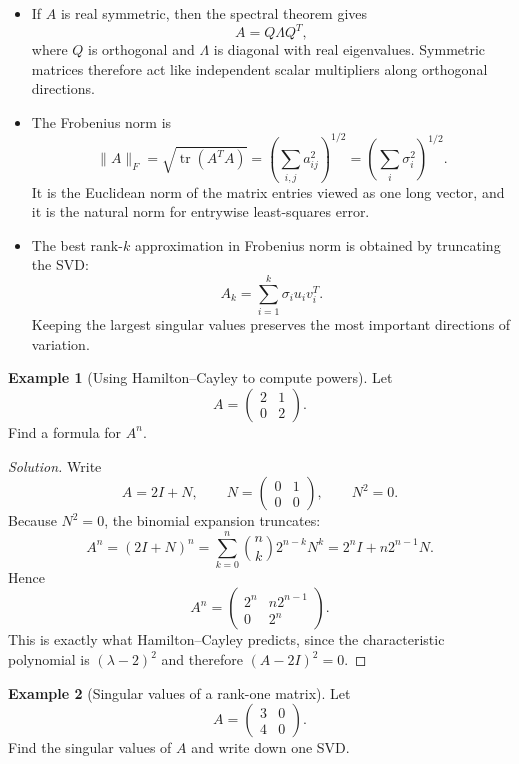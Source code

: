 \documentclass[11pt]{article}
\theoremstyle{definition}
\newtheorem{example}{Example}[section]
\newcommand{\trace}{\operatorname{tr}}
\begin{document}
\begin{itemize}
    \item If $A$ is real symmetric, then the spectral theorem gives
    \[
        A=Q\Lambda Q^T,
    \]
    where $Q$ is orthogonal and $\Lambda$ is diagonal with real eigenvalues. Symmetric matrices therefore act like independent scalar multipliers along orthogonal directions.
    \item The Frobenius norm is
    \[
        \|A\|_F=\sqrt{\trace(A^TA)}=\left(\sum_{i,j} a_{ij}^2\right)^{1/2}=\left(\sum_i \sigma_i^2\right)^{1/2}.
    \]
    It is the Euclidean norm of the matrix entries viewed as one long vector, and it is the natural norm for entrywise least-squares error.
    \item The best rank-$k$ approximation in Frobenius norm is obtained by truncating the SVD:
    \[
        A_k=\sum_{i=1}^k \sigma_i u_i v_i^T.
    \]
    Keeping the largest singular values preserves the most important directions of variation.
\end{itemize}

\begin{example}[Using Hamilton--Cayley to compute powers]
Let
\[
A=\begin{pmatrix}2&1\\0&2\end{pmatrix}.
\]
Find a formula for $A^n$.
\end{example}

\begin{proof}[Solution]
Write
\[
A=2I+N, \qquad N=\begin{pmatrix}0&1\\0&0\end{pmatrix}, \qquad N^2=0.
\]
Because $N^2=0$, the binomial expansion truncates:
\[
A^n=(2I+N)^n=\sum_{k=0}^n \binom{n}{k}2^{n-k}N^k = 2^n I + n2^{n-1}N.
\]
Hence
\[
A^n=
\begin{pmatrix}
2^n & n2^{n-1} \\
0 & 2^n
\end{pmatrix}.
\]
This is exactly what Hamilton--Cayley predicts, since the characteristic polynomial is $(\lambda-2)^2$ and therefore $(A-2I)^2=0$.
\end{proof}

\begin{example}[Singular values of a rank-one matrix]
Let
\[
A=\begin{pmatrix}3&0\\4&0\end{pmatrix}.
\]
Find the singular values of $A$ and write down one SVD.
\end{example}
\end{document}
